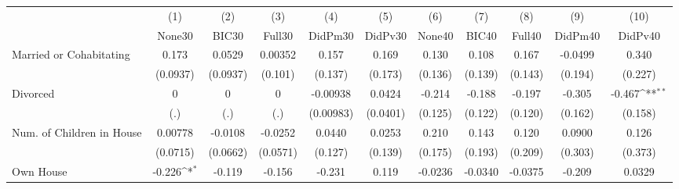 {
\def\sym#1{\ifmmode^{#1}\else\(^{#1}\)\fi}
\begin{tabular}{l*{10}{c}}
\toprule
            &\multicolumn{1}{c}{(1)}&\multicolumn{1}{c}{(2)}&\multicolumn{1}{c}{(3)}&\multicolumn{1}{c}{(4)}&\multicolumn{1}{c}{(5)}&\multicolumn{1}{c}{(6)}&\multicolumn{1}{c}{(7)}&\multicolumn{1}{c}{(8)}&\multicolumn{1}{c}{(9)}&\multicolumn{1}{c}{(10)}\\
            &\multicolumn{1}{c}{None30}&\multicolumn{1}{c}{BIC30}&\multicolumn{1}{c}{Full30}&\multicolumn{1}{c}{DidPm30}&\multicolumn{1}{c}{DidPv30}&\multicolumn{1}{c}{None40}&\multicolumn{1}{c}{BIC40}&\multicolumn{1}{c}{Full40}&\multicolumn{1}{c}{DidPm40}&\multicolumn{1}{c}{DidPv40}\\
\midrule
Married or Cohabitating&       0.173         &      0.0529         &     0.00352         &       0.157         &       0.169         &       0.130         &       0.108         &       0.167         &     -0.0499         &       0.340         \\
            &    (0.0937)         &    (0.0937)         &     (0.101)         &     (0.137)         &     (0.173)         &     (0.136)         &     (0.139)         &     (0.143)         &     (0.194)         &     (0.227)         \\
\addlinespace
Divorced    &           0         &           0         &           0         &    -0.00938         &      0.0424         &      -0.214         &      -0.188         &      -0.197         &      -0.305         &      -0.467\sym{**} \\
            &         (.)         &         (.)         &         (.)         &   (0.00983)         &    (0.0401)         &     (0.125)         &     (0.122)         &     (0.120)         &     (0.162)         &     (0.158)         \\
\addlinespace
Num. of Children in House&     0.00778         &     -0.0108         &     -0.0252         &      0.0440         &      0.0253         &       0.210         &       0.143         &       0.120         &      0.0900         &       0.126         \\
            &    (0.0715)         &    (0.0662)         &    (0.0571)         &     (0.127)         &     (0.139)         &     (0.175)         &     (0.193)         &     (0.209)         &     (0.303)         &     (0.373)         \\
\addlinespace
Own House   &      -0.226\sym{*}  &      -0.119         &      -0.156         &      -0.231         &       0.119         &     -0.0236         &     -0.0340         &     -0.0375         &      -0.209         &      0.0329         \\

\end{tabular}}
